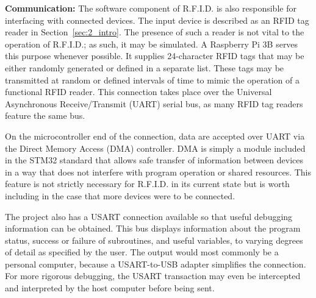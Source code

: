 \textbf{Communication:} The software component of R.F.I.D. is also responsible for interfacing with connected devices. The input device is described as an RFID tag reader in Section~\ref{sec:2_intro}. The presence of such a reader is not vital to the operation of R.F.I.D.; as such, it may be simulated. A Raspberry Pi 3B serves this purpose whenever possible. It supplies 24-character RFID tags that may be either randomly generated or defined in a separate list. These tags may be transmitted at random or defined intervals of time to mimic the operation of a functional RFID reader. This connection takes place over the Universal Asynchronous Receive/Transmit (UART) serial bus, as many RFID tag readers feature the same bus.

On the microcontroller end of the connection, data are accepted over UART via the Direct Memory Access (DMA) controller. DMA is simply a module included in the STM32 standard that allows safe transfer of information between devices in a way that does not interfere with program operation or shared resources. This feature is not strictly necessary for R.F.I.D. in its current state but is worth including in the case that more devices were to be connected. 

The project also has a USART connection available so that useful debugging information can be obtained. This bus displays information about the program status, success or failure of subroutines, and useful variables, to varying degrees of detail as specified by the user. The output would most commonly be a personal computer, because a USART-to-USB adapter simplifies the connection. For more rigorous debugging, the USART transaction may even be intercepted and interpreted by the host computer before being sent.

